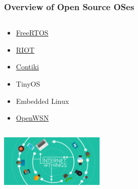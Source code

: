 \documentclass{beamer}
\begin{document}
\begin{frame}
	\frametitle{Overview of Open Source OSes}
	\begin{columns}[c]
		\begin{column}{30cm}
			\vspace{.1cm}
			\begin{itemize}
				\justifying
				\item \textcolor{blue}{\href{http://www.freertos.org}{FreeRTOS}}
				\item \textcolor{blue}{\href{http://www.riot-os.org}{RIOT}}
				\item \textcolor{blue}{\href{http://www.contiki-os.org}{Contiki}}
				\item TinyOS
				\item Embedded Linux
				\item \textcolor{blue}{\href{http://www.openwsn.org}{OpenWSN}}
			\end{itemize}
		\end{column}
	\end{columns}
	\vspace{.5cm}
	\hspace*{5.5cm} \includegraphics[width=5cm]{figs/Internet-of-Things-2.jpg}
\end{frame}
\end{document}
